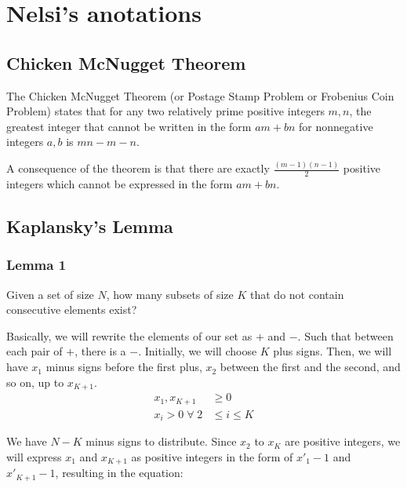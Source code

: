 

    
    \section{Nelsi's anotations}
    
        \subsection{Chicken McNugget Theorem}
            The Chicken McNugget Theorem (or Postage Stamp Problem or Frobenius Coin Problem) states that for any two relatively prime positive integers $m,n$, the greatest integer that cannot be written in the form $am + bn$ for nonnegative integers $a, b$ is $mn-m-n$.  
        
            A consequence of the theorem is that there are exactly $\frac{(m - 1)(n - 1)}{2}$ positive integers which cannot be expressed in the form $am + bn$.
        
        \subsection{Kaplansky's Lemma} 
            \subsubsection{Lemma 1}
                Given a set of size $N$, how many subsets of size $K$ that do not contain consecutive elements exist?
                
                Basically, we will rewrite the elements of our set as $+$ and $-$. Such that between each pair of $+$, there is a $-$. Initially, we will choose $K$ plus signs. Then, we will have $x_1$ minus signs before the first plus, $x_2$ between the first and the second, and so on, up to $x_{\scriptscriptstyle K+1}$.
                \begin{align*}
                    x_1, x_{\scriptscriptstyle K+1} &\ge 0\\
                    x_i > 0 \; \forall \; 2 &\le i \le K 
                \end{align*}
        
                We have $N-K$ minus signs to distribute. Since $x_2$ to $x_{\scriptscriptstyle K}$ are positive integers, we will express $x_1$ and $x_{\scriptscriptstyle K+1}$ as positive integers in the form of $x'_1-1$ and $x'_{\scriptscriptstyle K+1}-1$, resulting in the equation:
                
